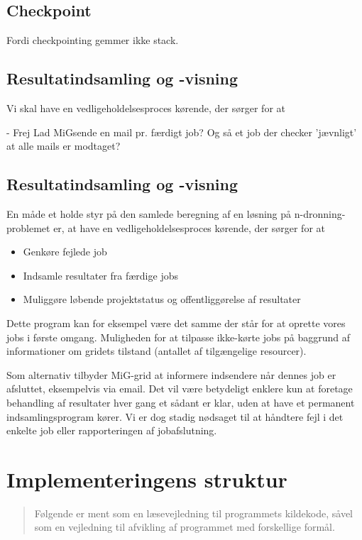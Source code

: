 \documentclass[final,a4paper,10pt]{article}
\newcommand{\mig}{MiG}
\begin{document}
\subsection{Checkpoint}

Fordi checkpointing gemmer ikke stack.


\subsection{Resultatindsamling og -visning}
Vi skal have en vedligeholdelsesproces kørende, der sørger for at 

- Frej Lad \mig sende en mail pr. færdigt job? Og så et job der checker 'jævnligt' at alle mails er modtaget?


\subsection{Resultatindsamling og -visning}
En måde et holde styr på den samlede beregning af en løsning på n-dronning-problemet er, at have en vedligeholdelsesproces kørende, der sørger for at 
\begin{itemize}
	\item Genkøre fejlede job
	\item Indsamle resultater fra færdige jobs
	\item Muliggøre løbende projektstatus og offentliggørelse af resultater 
\end{itemize}
Dette program kan for eksempel være det samme der står for at oprette vores jobs i første omgang. Muligheden for at tilpasse ikke-kørte jobs på baggrund af informationer om gridets tilstand (antallet af tilgængelige resourcer). 

Som alternativ tilbyder \mig-grid at informere indsendere når dennes job er afsluttet, eksempelvis via email. Det vil være betydeligt enklere kun at foretage behandling af resultater hver gang et sådant er klar, uden at have et permanent indsamlingsprogram kører. Vi er dog stadig nødsaget til at håndtere fejl i det enkelte job eller rapporteringen af jobafslutning. 



\section{Implementeringens struktur}\label{implementeringensstruktur}
\begin{verse}
	Følgende er ment som en læsevejledning til programmets kildekode, såvel som en vejledning til afvikling af programmet med forskellige formål. 
\end{verse}
\end{document}
